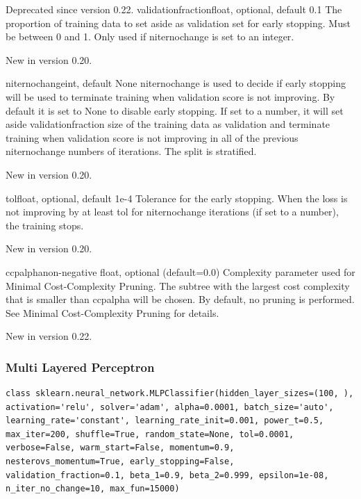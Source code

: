 \documentclass[12pt]{article}
\begin{document}
\begin{itemize}
Deprecated since version 0.22.
validation\textunderscore fractionfloat, optional, default 0.1
The proportion of training data to set aside as validation set for early stopping. Must be between 0 and 1. Only used if n\textunderscore iter\textunderscore no\textunderscore change is set to an integer.

New in version 0.20.

n\textunderscore iter\textunderscore no\textunderscore changeint, default None
n\textunderscore iter\textunderscore no\textunderscore change is used to decide if early stopping will be used to terminate training when validation score is not improving. By default it is set to None to disable early stopping. If set to a number, it will set aside validation\textunderscore fraction size of the training data as validation and terminate training when validation score is not improving in all of the previous n\textunderscore iter\textunderscore no\textunderscore change numbers of iterations. The split is stratified.

New in version 0.20.

tolfloat, optional, default 1e-4
Tolerance for the early stopping. When the loss is not improving by at least tol for n\textunderscore iter\textunderscore no\textunderscore change iterations (if set to a number), the training stops.

New in version 0.20.

ccp\textunderscore alphanon-negative float, optional (default=0.0)
Complexity parameter used for Minimal Cost-Complexity Pruning. The subtree with the largest cost complexity that is smaller than ccp\textunderscore alpha will be chosen. By default, no pruning is performed. See Minimal Cost-Complexity Pruning for details.

New in version 0.22.
\end{itemize}

\newpage
\subsubsection{Multi Layered Perceptron}
\begin{lstlisting}
class sklearn.neural_network.MLPClassifier(hidden_layer_sizes=(100, ), activation='relu', solver='adam', alpha=0.0001, batch_size='auto', learning_rate='constant', learning_rate_init=0.001, power_t=0.5, max_iter=200, shuffle=True, random_state=None, tol=0.0001, verbose=False, warm_start=False, momentum=0.9, nesterovs_momentum=True, early_stopping=False, validation_fraction=0.1, beta_1=0.9, beta_2=0.999, epsilon=1e-08, n_iter_no_change=10, max_fun=15000)
\end{lstlisting}
\end{document}
